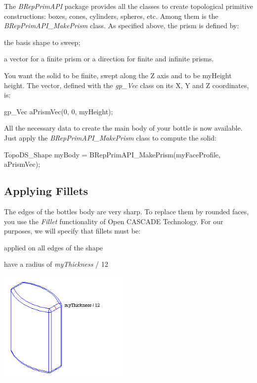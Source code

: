 The {\itshape B\+Rep\+Prim\+A\+PI} package provides all the classes to create topological primitive constructions\+: boxes, cones, cylinders, spheres, etc. Among them is the {\itshape B\+Rep\+Prim\+A\+P\+I\+\_\+\+Make\+Prism} class. As specified above, the prism is defined by\+:


\begin{DoxyItemize}
\item the basis shape to sweep;
\item a vector for a finite prism or a direction for finite and infinite prisms.
\end{DoxyItemize}

You want the solid to be finite, swept along the Z axis and to be my\+Height height. The vector, defined with the {\itshape gp\+\_\+\+Vec} class on its X, Y and Z coordinates, is\+:


\begin{DoxyCode}
gp\_Vec aPrismVec(0, 0, myHeight);
\end{DoxyCode}


All the necessary data to create the main body of your bottle is now available. Just apply the {\itshape B\+Rep\+Prim\+A\+P\+I\+\_\+\+Make\+Prism} class to compute the solid\+:


\begin{DoxyCode}
TopoDS\_Shape myBody = BRepPrimAPI\_MakePrism(myFaceProfile, aPrismVec);
\end{DoxyCode}
\hypertarget{occt__tutorial_OCCT_TUTORIAL_SUB3_2}{}\subsection{Applying Fillets}\label{occt__tutorial_OCCT_TUTORIAL_SUB3_2}
The edges of the bottle\textquotesingle{}s body are very sharp. To replace them by rounded faces, you use the {\itshape Fillet} functionality of Open C\+A\+S\+C\+A\+DE Technology. For our purposes, we will specify that fillets must be\+:


\begin{DoxyItemize}
\item applied on all edges of the shape
\item have a radius of {\itshape my\+Thickness} / 12
\end{DoxyItemize}


\begin{DoxyImageNoCaption}
\begin{center}
   \mbox{\includegraphics[width=240]{tutorial_image008.png}}
\end{center}
\end{DoxyImageNoCaption}


